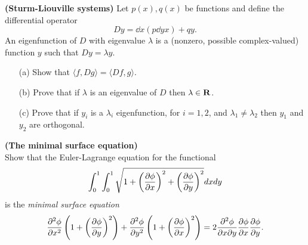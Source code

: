\documentclass[12pt]{article}
\begin{document}
\bigskip

\begin{question}{\bf (Sturm-Liouville systems)}
Let $p(x),q(x)$ be functions and define the differential operator
\[Dy=\dd{}{x}\left(p\dd{y}{x}\right)+qy.\]
An eigenfunction of $D$ with eigenvalue $\lambda$ is a (nonzero, possible complex-valued) function $y$ such that $Dy=\lambda y$.
\begin{enumerate}
\item[(a)] Show that $\langle f,Dg\rangle=\langle Df,g\rangle$.
\item[(b)] Prove that if $\lambda$ is an eigenvalue of $D$ then $\lambda\in\mathbf{R}$.
\item[(c)] Prove that if $y_i$ is a $\lambda_i$ eigenfunction, for $i=1,2$, and $\lambda_1\neq\lambda_2$ then $y_1$ and $y_2$ are orthogonal.
\end{enumerate}
\end{question}

\bigskip

\begin{question}{\bf (The minimal surface equation)}\\
Show that the Euler-Lagrange equation for the functional
\[\int_0^1\int_0^1\sqrt{1+\left(\dfrac{\partial \phi}{\partial x}\right)^2+\left(\dfrac{\partial \phi}{\partial y}\right)^2}dxdy\]
is the {\em minimal surface equation}
\[\dfrac{\partial^2 \phi}{\partial x^2}\left(1+\left(\dfrac{\partial \phi}{\partial y}\right)^2\right)+\dfrac{\partial^2 \phi}{\partial y^2}\left(1+\left(\dfrac{\partial \phi}{\partial x}\right)^2\right)=2\dfrac{\partial^2 \phi}{\partial x\partial y}\dfrac{\partial \phi}{\partial x}\dfrac{\partial \phi}{\partial y}.\]
\end{question}

\newpage
\end{document}

